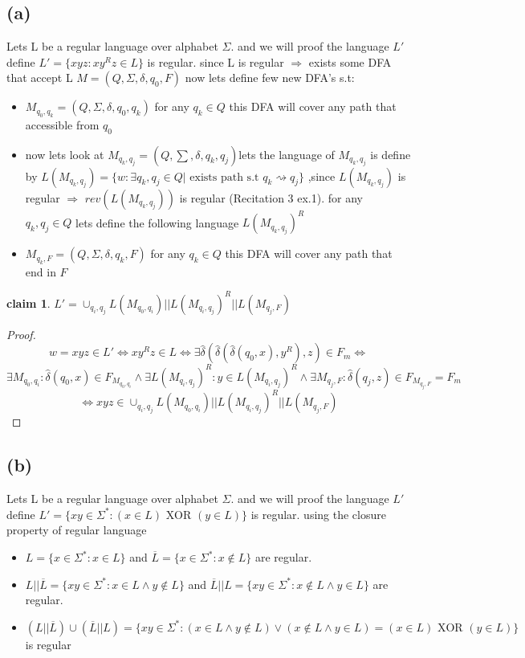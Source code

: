 \documentclass[12pt]{article}
\newtheorem{claim}[theorem]{claim}
\begin{document}
\subsection*{(a)}
Lets L be a regular language over alphabet $\Sigma$. and we will proof the language $L'$ define $L'=\lbrace xyz:xy^Rz \in L \rbrace$ is regular. since L is regular $\Rightarrow$ exists some DFA that accept L $M=(Q,\Sigma ,\delta,q_0,F)$ now lets define few new DFA's  s.t:
\begin{itemize}
\item $M_{q_0,q_k}=(Q,\Sigma ,\delta,q_0,q_k)$ for any $q_k\in Q $ this DFA will cover any path that accessible from $q_0$ 
\item now lets look at $M_{q_k,q_j}=(Q,\sum ,\delta,q_k,q_j)$lets the language of $M_{q_k,q_j}$ is define by $L(M_{q_k,q_j})=\lbrace w :\exists q_k,q_j \in Q | \text{ exists path s.t }q_k \rightsquigarrow q_j \rbrace$ ,since $L(M_{q_k,q_j})$ is regular $\Rightarrow$ $rev(L(M_{q_k,q_j}))$ is regular (Recitation 3  ex.1). for any $q_k,q_j\in Q$ lets define the following language  $L(M_{q_k,q_j})^R$ 
\item $M_{q_k,F}=(Q,\Sigma ,\delta,q_k,F)$ for any $q_k\in Q $ this DFA will cover any path that end in $F$
\end{itemize}
\begin{claim}
$L'=\cup_{q_i,q_j}L(M_{q_0,q_i})||L(M_{q_i,q_j})^R||L(M_{q_j,F})$
\end{claim}
\begin{proof}
\[ w=xyz \in L' \Leftrightarrow xy^Rz \in L 
\Leftrightarrow \exists \hat{\delta}(\hat{\delta}(\hat{\delta}(q_0,x),y^R),z) \in F_m \Leftrightarrow
\]
\[
\exists M_{q_0,q_i}:\hat{\delta}(q_0,x)\in F_{ M_{q_0,q_i}} \wedge \exists L(M_{q_i,q_j})^R : y\in L(M_{q_i,q_j})^R \wedge \exists M_{q_j,F}:\hat{\delta}(q_j,z)\in F_{ M_{q_j,F}}=F_m
\]
\[ \Leftrightarrow xyz\in \cup_{q_i,q_j}L(M_{q_0,q_i})||L(M_{q_i,q_j})^R||L(M_{q_j,F})
\]
\end{proof}
\subsection*{(b)}
Lets L be a regular language over alphabet $\Sigma$. and we will proof the language $L'$ define $L'=\lbrace xy  \in \Sigma^* :(x\in L) \text{ XOR } (y\in L) \rbrace$ is regular.
using the  closure property of regular language
\begin{itemize}
\item $L=\lbrace x\in \Sigma^* : x\in L \rbrace$ and $\overline{L}=\lbrace x\in \Sigma^* : x\notin  L \rbrace$ are regular.
\item $L||\overline{L}=\lbrace xy\in \Sigma^* : x\in L \wedge y \notin L \rbrace$ and $\overline{L}||L=\lbrace xy\in \Sigma^* : x\notin L \wedge y \in L \rbrace$ are regular.
\item $(L||\overline{L}) \cup (\overline{L}||L)=\lbrace xy\in \Sigma^* : (x\in L \wedge y\notin L )\vee (x\notin L \wedge y\in L ) =(x\in L) \text{ XOR } (y\in L) \rbrace$ is regular
\end{itemize}
\end{document}
